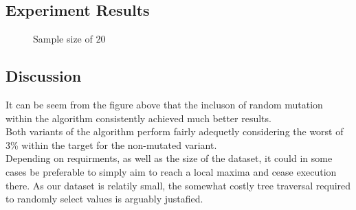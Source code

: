 \documentclass[a4paper]{article}
\begin{document}
  
\newpage
\subsection{Experiment Results}

\begin{figure}[h]
  
\centering
\caption{Sample size of $20$}
\label{fig:x Mutation Plot}

\end{figure}

\subsection{Discussion}

It can be seem from the figure above that the incluson of random mutation within
the algorithm consistently achieved much better results. \\

Both variants of the algorithm perform fairly adequetly considering the
worst of 3\% within the target for the non-mutated variant. \\

Depending on requirments, as well as the size of the dataset,
it could in some cases be preferable to simply aim 
to reach a local maxima and cease execution there. 
As our dataset is relatily small, the somewhat costly tree traversal required
to randomly select values is arguably justafied. \\
\end{document}
